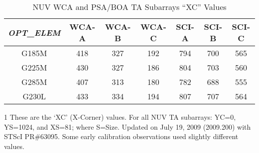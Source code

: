 \begin{table}
\centering
	\begin{threeparttable}[tbc]
		\caption{NUV  WCA and PSA/BOA TA Subarrays ``XC'' Values}
			\begin{tabular*}{.75\linewidth}{@{\extracolsep{\fill}}ccccccc}
			\\
			\hline
			\textit{OPT\_ELEM}&WCA-A & WCA-B &WCA-C &SCI-A&SCI-B&SCI-C\\
			\hline
			G185M	&	418	&	327	&	192	&	794	&	700	&	565	\\
			G225M	&	430	&	327	&	186	&	804	&	703	&	560	\\
			G285M	&	407	&	313	&	180	&	782	&	688	&	555	\\
			G230L	&	433	&	334	&	194	&	807	&	707	&	564 \\
			\hline
		\end{tabular*}
		\footnotesize
			\begin{tablenotes}
				\item[1] These are the `XC' (X-Corner) values. For all NUV  TA subarrays: YC=0, YS=1024, and XS=81; where S=Size. Updated on July 19, 2009 (2009.200) with STScI PR\#63095. Some early calibration observations used slightly different values.
			\end{tablenotes}
			\label{tab:NUVspSUBSxd}
		\normalsize
	\end{threeparttable}
\end{table}
